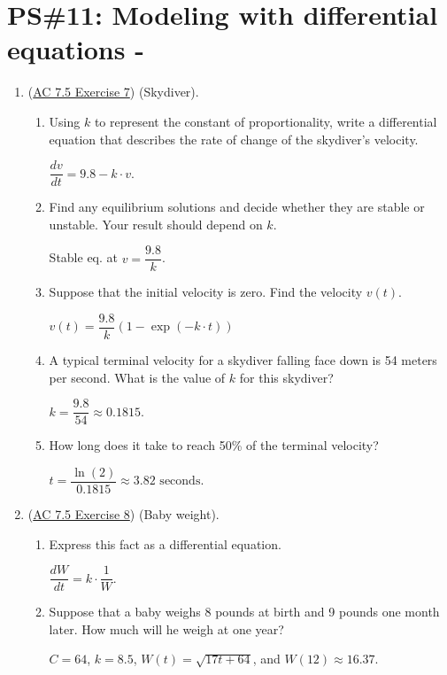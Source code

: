 


%


\allowdisplaybreaks
\section{PS\#11: Modeling with differential equations -  }


\begin{enumerate}[leftmargin=0pt]

\item (\href{https://activecalculus.org/single/sec-7-5-modeling.html#ez-7-5-7}{AC 7.5 Exercise 7}) (Skydiver).
\begin{enumerate}
    \item Using $k$ to represent the constant of proportionality, write a differential equation that describes the rate of change of the skydiver's velocity.
    \begin{red}
        $\dfrac{dv}{dt} = 9.8 - k\cdot v.$
    \end{red}
    \item Find any equilibrium solutions and decide whether they are stable or unstable. Your result should depend on $k$.
    \begin{red} Stable eq. at $v = \dfrac{9.8}{k}$.
    \end{red}
    \item Suppose that the initial velocity is zero. Find the velocity $v(t)$.
    \begin{red}$v(t) = \dfrac{9.8}{k}\left(1 - \exp(-k\cdot t)\right)$
    \end{red}
    \item A typical terminal velocity for a skydiver falling face down is 54 meters per second. What is the value of $k$ for this skydiver?
    \begin{red} $k =\dfrac{9.8}{54} \approx 0.1815.$
    \end{red}
    \item How long does it take to reach 50\% of the terminal velocity?
    \begin{red} $t = \dfrac{\ln(2)}{0.1815} \approx 3.82\text{ seconds}$. \end{red}
\end{enumerate}

\item (\href{https://faculty.gvsu.edu/boelkinm/Home/ACS/sec-7-5-modeling.html#DfO}{AC 7.5 Exercise 8}) (Baby weight).
\begin{enumerate}
    \item Express this fact as a differential equation. \begin{red}
        $\dfrac{dW}{dt} = k\cdot\dfrac{1}{W}.$
    \end{red}
    \item Suppose that a baby weighs 8 pounds at birth and 9 pounds one month later. How much will he weigh at one year?
    \begin{red}
        $C = 64$, $k = 8.5$, $W(t) = \sqrt{17t+64}$, and $W(12) \approx 16.37$.


\end{red}
\end{enumerate}
\end{enumerate}
